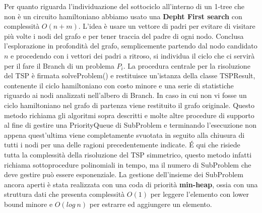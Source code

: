 \documentclass[
	article,			%
	12pt,				%
	oneside,			%
	a4paper,			%
	english,			%
	italian,				%
	sumario=tradicional,
	]{abntex2}
\begin{document}
\newline
\newline
Per quanto riguarda l'individuazione del sottociclo all'interno di un 1-tree che non è un circuito hamiltoniano abbiamo usato una \textbf{Depht First search} con complessità $O(n+m)$. L'idea è usare un vettore di padri per evitare di visitare più volte i nodi del grafo e per tener traccia del padre di ogni nodo. Conclusa l'esplorazione in profondità del grafo, semplicemente partendo dal nodo candidato $n$ e procedendo con i vettori dei padri a ritroso, si individua il ciclo che ci servirà per il fare il Branch di un problema $P_i$.
\newline
\newline
La procedura centrale per la risoluzione del TSP è firmata  {\selectfont solveProblem()} e restituisce un'istanza della classe {\selectfont TSPResult}, contenente il ciclo hamiltoniano con costo minore e una serie di statistiche riguardo ai nodi analizzati nell'albero di Branch. In caso in cui non vi fosse un ciclo hamiltoniano nel grafo di partenza viene restituito il grafo originale. Questo metodo richiama gli algoritmi sopra descritti e molte altre procedure di supporto al fine di gestire una {\selectfont PriorityQueue} di {\selectfont SubProblem} e terminando l'esecuzione non appena quest'ultima viene completamente svuotata in seguito alla chiusura di tutti i nodi per una delle ragioni precedentemente indicate. \'E qui che risiede tutta la complessità della risoluzione del TSP simmetrico, questo metodo infatti richiama sottoprocedure polinomiali in tempo, ma il numero di {\selectfont SubProblem} che deve gestire può essere esponenziale.
\newline
La gestione dell'insieme dei SubProblem ancora aperti è stata realizzata con una coda di priorità \textbf{min-heap}, ossia con una struttura dati che presenta complessità $O(1)$ per leggere l'elemento con lower bound minore e $O(log\:n)$ per estrarre ed aggiungere un elemento.
\newline
\newline
\end{document}
